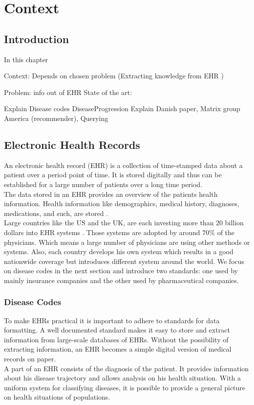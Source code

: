 \graphicspath{ {Context/Images/} }


\chapter{Context}
\label{cha:context}

\section{Introduction}
In this chapter 

Context: Depends on chosen problem (Extracting knowledge from EHR )

	Problem: info out of EHR
	State of the art:
	
		Explain Disease codes
		DiseaseProgression
		Explain Danish paper, Matrix group America (recommender), Querying


\section{Electronic Health Records}

An electronic health record (EHR) is a collection of time-stamped data about a patient over a period point of time. It is stored digitally and thus can be established for a large number of patients over a long time period. \\
The data stored in an EHR provides an overview of the patients health information. Health information like demographics, medical history, diagnoses, medications, and such, are stored \cite{HealthIT:online}. \\

Large countries like the US and the UK, are each investing more than $20$ billion dollars into EHR systems \cite{EHRworld:article}. Those systems are adopted by around $70$\% of the physicians. Which means a large number of physicians are using other methods or systems. Also, each country develops his own system which results in a good nationwide coverage but introduces different system around the world. We focus on disease codes in the next section and introduce two standards: one used by mainly insurance companies and the other used by pharmaceutical companies.


\subsection{Disease Codes}

To make EHRs practical it is important to adhere to standards for data formatting. A well documented standard makes it easy to store and extract information from large-scale databases of EHRs. Without the possibility of extracting information, an EHR becomes a simple digital version of medical records on paper. \\
A part of an EHR consists of the diagnosis of the patient. It provides information about his disease trajectory and allows analysis on his health situation. With a uniform system for classifying diseases, it is possible to provide a general picture on health situations of populations.

